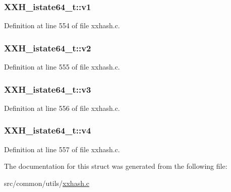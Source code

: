 \hypertarget{struct_x_x_h__istate64__t_a5bdd6967a8d80194d4e55b2f61431b8f}{}
\subsubsection[{v1}]{ X\+X\+H\+\_\+istate64\+\_\+t\+::v1}\label{struct_x_x_h__istate64__t_a5bdd6967a8d80194d4e55b2f61431b8f}


Definition at line 554 of file xxhash.\+c.

\hypertarget{struct_x_x_h__istate64__t_a8e14247869d90a1eea79cd99c0b06029}{}
\subsubsection[{v2}]{ X\+X\+H\+\_\+istate64\+\_\+t\+::v2}\label{struct_x_x_h__istate64__t_a8e14247869d90a1eea79cd99c0b06029}


Definition at line 555 of file xxhash.\+c.

\hypertarget{struct_x_x_h__istate64__t_a714d26f89359d5b897e3e8ffa97b946d}{}
\subsubsection[{v3}]{ X\+X\+H\+\_\+istate64\+\_\+t\+::v3}\label{struct_x_x_h__istate64__t_a714d26f89359d5b897e3e8ffa97b946d}


Definition at line 556 of file xxhash.\+c.

\hypertarget{struct_x_x_h__istate64__t_aeb3e5e9f7d5ce61021dca87fae23df27}{}
\subsubsection[{v4}]{ X\+X\+H\+\_\+istate64\+\_\+t\+::v4}\label{struct_x_x_h__istate64__t_aeb3e5e9f7d5ce61021dca87fae23df27}


Definition at line 557 of file xxhash.\+c.



The documentation for this struct was generated from the following file\+:\begin{DoxyCompactItemize}
\item 
src/common/utils/\hyperlink{xxhash_8c}{xxhash.\+c}\end{DoxyCompactItemize}
